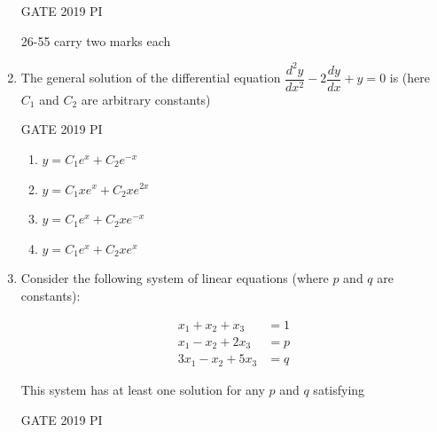 \documentclass[journal,12pt,onecolumn]{IEEEtran}
\theoremstyle{remark}
\begin{document}
\begin{enumerate}
\hfill{GATE 2019 PI}



26-55 carry two marks each
\item The general solution of the differential equation $\dfrac{d^2 y}{dx^2} - 2\dfrac{dy}{dx} + y = 0$ is (here $C_1$ and $C_2$ are arbitrary constants)

\hfill{GATE 2019 PI}

\begin{multicols}{2}
\begin{enumerate}
    \item $y = C_1 e^{x} + C_2 e^{-x}$
    \item $y = C_1 x e^{x} + C_2 x e^{2x}$
    \item $y = C_1 e^{x} + C_2 x e^{-x}$
    \item $y = C_1 e^{x} + C_2 x e^{x}$
\end{enumerate}
\end{multicols}

\item Consider the following system of linear equations (where $p$ and $q$ are constants):

\[
\begin{aligned}
x_1 + x_2 + x_3 & = 1 \\
x_1 - x_2 + 2x_3 & = p \\
3x_1 - x_2 + 5x_3 & = q
\end{aligned}
\]

This system has at least one solution for any $p$ and $q$ satisfying

\hfill{GATE 2019 PI}


\end{enumerate}
\end{document}
